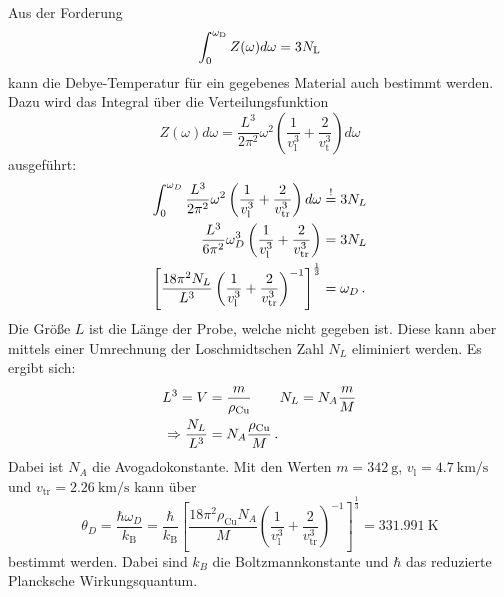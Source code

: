 Aus der Forderung 
\begin{equation}
    \int_0^{\omega_\text D} Z(\omega) d\omega = 3 N_\text L
\end{equation}
kann die Debye-Temperatur für ein gegebenes Material auch bestimmt werden. Dazu wird das Integral über die Verteilungsfunktion 
\begin{equation}
    Z(\omega)d\omega = \frac{L^3}{2\pi^2}\omega^2\left(\frac{1}{v_\text{l}^3}+\frac{2}{v_{\text{t}}^3}\right)d\omega
\end{equation}
ausgeführt:
\begin{align*}
	\int_0^{\omega_D} \frac{L^3}{2\pi^2}\omega^2\left(\frac{1}{v_\text{l}^3}+\frac{2}{v_\text{tr}^3}\right) d\omega &\overset{!}{=} 3 N_L\\
	\frac{L^3}{6\pi^2}\omega_D^3\left(\frac{1}{v_\text{l}^3}+\frac{2}{v_\text{tr}^3}\right)  &= 3N_L\\
	\left[\frac{18\pi^2N_L}{L^3}\left(\frac{1}{v_\text{l}^3}+\frac{2}{v_\text{tr}^3}\right)^{-1} \right]^{\frac{1}{3}} &= \omega_D \,\text.
\end{align*}
Die Größe $L$ ist die Länge der Probe, welche nicht gegeben ist. Diese kann aber mittels einer Umrechnung der Loschmidtschen Zahl $N_L$ eliminiert werden. Es ergibt sich:
\begin{align*}
	L^3 = V &= \frac{m}{\rho_\text{Cu}}\qquad N_L = N_A\frac{m}{M}\\
	\Rightarrow \frac{N_L}{L^3} &= N_A\frac{\rho_\text{Cu}}{M}\,\text.
\end{align*}
Dabei ist $N_A$ die Avogadokonstante.
Mit den Werten $m = \SI{342}{\gram}$, $v_\text{l} = \SI{4.7}{\kilo\metre\per\second}$ und $v_\text{tr} = \SI{2.26}{\kilo\meter\per\second}$ kann über
\begin{equation*}
	\theta_D = \frac{\hbar\omega_D}{k_\text{B}}= \frac{\hbar}{k_\text{B}}\left[\frac{18\pi^2\rho_\text{Cu} N_A}{M}\left(\frac{1}{v_\text{l}^3}+\frac{2}{v_\text{tr}^3}\right)^{-1} \right]^{\frac{1}{3}} = \SI{331.991}{\kelvin}
\end{equation*} bestimmt werden. Dabei sind $k_B$ die Boltzmannkonstante und $\hbar$ das reduzierte Plancksche Wirkungsquantum.

